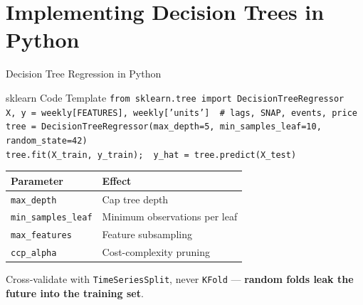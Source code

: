 \documentclass[aspectratio=169, 11pt]{beamer}
\begin{document}
\section{Implementing Decision Trees in Python}


\begin{frame}{Decision Tree Regression in Python}
  \begin{examplebox}{sklearn Code Template}
    {\scriptsize
    \texttt{from sklearn.tree import DecisionTreeRegressor}\\
    \texttt{X, y = weekly[FEATURES], weekly['units']\ \ \# lags, SNAP, events, price}\\
    \texttt{tree = DecisionTreeRegressor(max\_depth=5, min\_samples\_leaf=10, random\_state=42)}\\
    \texttt{tree.fit(X\_train, y\_train);\ \ y\_hat = tree.predict(X\_test)}
    }
  \end{examplebox}
  \vspace{-0.15cm}
  \begin{center}
    {\footnotesize
    \begin{tabular}{ll}
      \toprule
      \textbf{Parameter} & \textbf{Effect} \\
      \midrule
      \texttt{max\_depth}         & Cap tree depth \\
      \texttt{min\_samples\_leaf} & Minimum observations per leaf \\
      \texttt{max\_features}      & Feature subsampling \\
      \texttt{ccp\_alpha}         & Cost-complexity pruning \\
      \bottomrule
    \end{tabular}
    }
  \end{center}
  \vspace{-0.15cm}
  {\small Cross-validate with \texttt{TimeSeriesSplit}, never \texttt{KFold} ---
  \textbf{random folds leak the future into the training set}.}
\end{frame}
\end{document}
